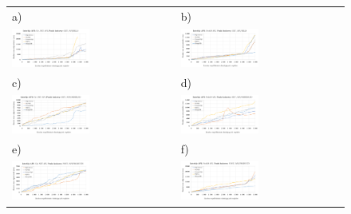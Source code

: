 \begin{figure}[htb]
  \centering
	\begin{tabular}{@{}ll@{}}
    a) & b) \\
    \includegraphics[width=0.49\textwidth]{rys05/response-dotnet-fetchAllBills.pdf} & \includegraphics[width=0.49\textwidth]{rys05/response-nodejs-fetchAllBills.pdf} \\
    c) & d) \\
    \includegraphics[width=0.49\textwidth]{rys05/response-dotnet-getSingleOrder.pdf} & \includegraphics[width=0.49\textwidth]{rys05/response-nodejs-getSingleOrder.pdf} \\
    e) & f) \\
    \includegraphics[width=0.49\textwidth]{rys05/response-dotnet-addProduct.pdf} & \includegraphics[width=0.49\textwidth]{rys05/response-nodejs-addProduct.pdf} \\

\end{tabular}
\end{figure}

